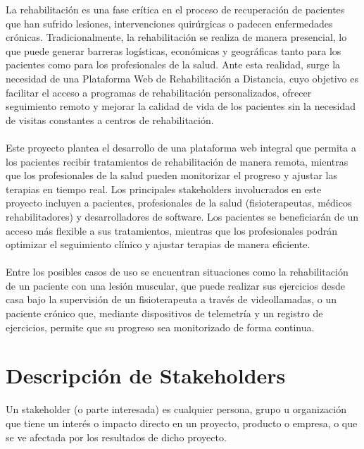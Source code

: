 \documentclass{article}
\begin{document}
La rehabilitación es una fase crítica en el proceso de recuperación de pacientes que han sufrido lesiones, intervenciones quirúrgicas o padecen enfermedades crónicas. Tradicionalmente, la rehabilitación se realiza de manera presencial, lo que puede generar barreras logísticas, económicas y geográficas tanto para los pacientes como para los profesionales de la salud. Ante esta realidad, surge la necesidad de una Plataforma Web de Rehabilitación a Distancia, cuyo objetivo es facilitar el acceso a programas de rehabilitación personalizados, ofrecer seguimiento remoto y mejorar la calidad de vida de los pacientes sin la necesidad de visitas constantes a centros de rehabilitación.
\\
\\
Este proyecto plantea el desarrollo de una plataforma web integral que permita a los pacientes recibir tratamientos de rehabilitación de manera remota, mientras que los profesionales de la salud pueden monitorizar el progreso y ajustar las terapias en tiempo real. Los principales stakeholders involucrados en este proyecto incluyen a pacientes, profesionales de la salud (fisioterapeutas, médicos rehabilitadores) y desarrolladores de software. Los pacientes se beneficiarán de un acceso más flexible a sus tratamientos, mientras que los profesionales podrán optimizar el seguimiento clínico y ajustar terapias de manera eficiente.
\\
\\
Entre los posibles casos de uso se encuentran situaciones como la rehabilitación de un paciente con una lesión muscular, que puede realizar sus ejercicios desde casa bajo la supervisión de un fisioterapeuta a través de videollamadas, o un paciente crónico que, mediante dispositivos de telemetría y un registro de ejercicios, permite que su progreso sea monitorizado de forma continua.


	
	\section{Descripción de Stakeholders}
	
	Un stakeholder (o parte interesada) es cualquier persona, grupo u organización que tiene un interés o impacto directo en un proyecto, producto o empresa, o que se ve afectada por los resultados de dicho proyecto. 
	
\end{document}
